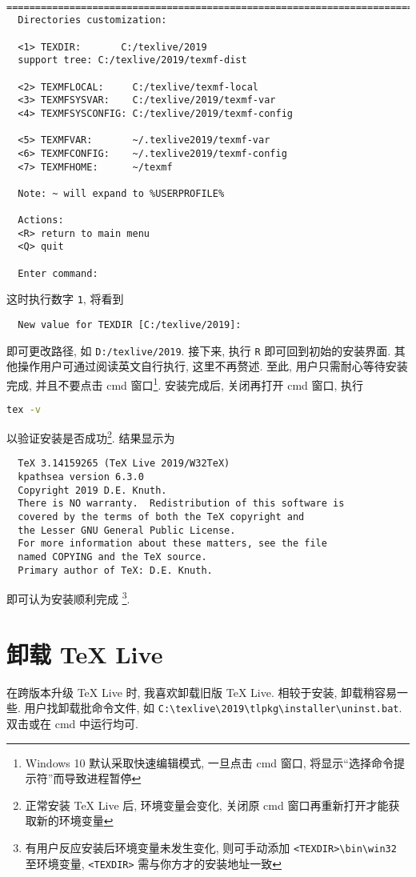 \documentclass{ctexrep}
\begin{document}
\begin{lstlisting}
  ==============================================================================
  Directories customization:
  
  <1> TEXDIR:       C:/texlive/2019
  support tree: C:/texlive/2019/texmf-dist
  
  <2> TEXMFLOCAL:     C:/texlive/texmf-local
  <3> TEXMFSYSVAR:    C:/texlive/2019/texmf-var
  <4> TEXMFSYSCONFIG: C:/texlive/2019/texmf-config
  
  <5> TEXMFVAR:       ~/.texlive2019/texmf-var
  <6> TEXMFCONFIG:    ~/.texlive2019/texmf-config
  <7> TEXMFHOME:      ~/texmf
  
  Note: ~ will expand to %USERPROFILE%
  
  Actions:
  <R> return to main menu
  <Q> quit
  
  Enter command:
\end{lstlisting}
这时执行数字 \texttt{1}, 将看到
\begin{lstlisting}
  New value for TEXDIR [C:/texlive/2019]:
\end{lstlisting}
即可更改路径, 如 \texttt{D:/texlive/2019}. 
接下来, 执行 \texttt{R} 即可回到初始的安装界面. 
其他操作用户可通过阅读英文自行执行, 这里不再赘述. 
至此, 用户只需耐心等待安装完成, 并且不要点击 \textsf{cmd} 窗口\footnote{Windows 10 默认采取快速编辑模式, 一旦点击 \textsf{cmd} 窗口, 将显示``选择命令提示符''而导致进程暂停}. 
安装完成后, 关闭再打开 \textsf{cmd} 窗口, 执行
\begin{lstlisting}[language = bash]
  tex -v
\end{lstlisting}
以验证安装是否成功\footnote{正常安装 \TeX{} Live 后, 环境变量会变化, 关闭原 \textsf{cmd} 窗口再重新打开才能获取新的环境变量}. 
结果显示为
\begin{lstlisting}
  TeX 3.14159265 (TeX Live 2019/W32TeX)
  kpathsea version 6.3.0
  Copyright 2019 D.E. Knuth.
  There is NO warranty.  Redistribution of this software is
  covered by the terms of both the TeX copyright and
  the Lesser GNU General Public License.
  For more information about these matters, see the file
  named COPYING and the TeX source.
  Primary author of TeX: D.E. Knuth.
\end{lstlisting}
即可认为安装顺利完成 \footnote{有用户反应安装后环境变量未发生变化, 则可手动添加 \texttt{<TEXDIR>\textbackslash bin\textbackslash win32} 至环境变量, \texttt{<TEXDIR>} 需与你方才的安装地址一致}. 

\section{卸载 \TeX{} Live}
在跨版本升级 \TeX{} Live 时, 我喜欢卸载旧版 \TeX{} Live. 
相较于安装, 卸载稍容易一些. 
用户找卸载批命令文件, 如 \texttt{C:\textbackslash texlive\textbackslash 2019\textbackslash tlpkg\textbackslash installer\textbackslash uninst.bat}. 
双击或在 \textsf{cmd} 中运行均可. 
\end{document}
